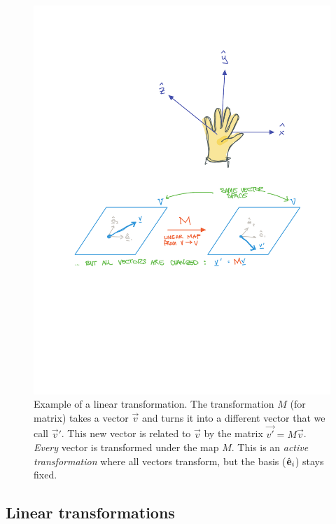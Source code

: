 \documentclass[12pt]{article}
\begin{document}
\begin{figure}[tb]
    \centering
    \includegraphics[width=\textwidth]{figures/lineartransformation.pdf}
    \caption{Example of a linear transformation. The transformation $M$ (for matrix) takes a vector $\vec{v}$ and turns it into a different vector that we call $\vec{v}'$. This new vector is related to $\vec{v}$ by the matrix $\vec{v'}=M\vec{v}$. \emph{Every} vector is transformed under the map $M$. This is an \emph{active transformation} where all vectors transform, but the basis (${\hat{\mathbf{e}}}_i$) stays fixed.}
    \label{fig:Linear Transformation}
\end{figure}



\subsection{Linear transformations}
\end{document}
